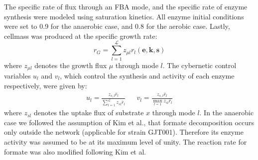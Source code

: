 \documentclass[10pt,twocolumn,twoside,final]{IEEEtran}
\begin{document}
The specific rate of flux through an FBA mode, and the specific rate of enzyme synthesis were modeled using saturation kinetics.
All enzyme initial conditions were set to 0.9 for the anaerobic case, and 0.8 for the aerobic case.
Lastly, cellmass was produced at the specific growth rate:
\begin{equation}
	r_{G}  = \sum_{l = 1}^{\mathcal{L}}z_{\mu l}r_{l}\left(\mathbf{e},\mathbf{k},\mathbf{s}\right)
\end{equation}
where $z_{\mu l}$ denotes the growth flux $\mu$ through mode $l$.
The cybernetic control variables $u_{l}$ and $v_{l}$, which control the synthesis and activity of each enzyme respectively, were given by:
\begin{align*}
	u_{l}  = \frac{z_{s,l}\bar{r}_{l}}{\sum\limits_{l = 1}^{\mathcal{L}}z_{sl}\bar{r}_{l}} && v_{l} = \frac{z_{s,l}\bar{r}_{l}}{\max\limits_{l=1} z_{sl}\bar{r}_{l}}
\end{align*}
where $z_{sl}$ denotes the uptake flux of substrate $x$ through mode $l$.
In the anaerobic case we followed the assumption of Kim et al.\cite{2008_kim_varner_ramkrishna_BiotechProg},
that formate decomposition occurs only outside the network (applicable for strain GJT001).
Therefore its enzyme activity was assumed to be at its maximum level of unity.
The reaction rate for formate was also modified following Kim et al.\cite{2008_kim_varner_ramkrishna_BiotechProg}
\end{document}
